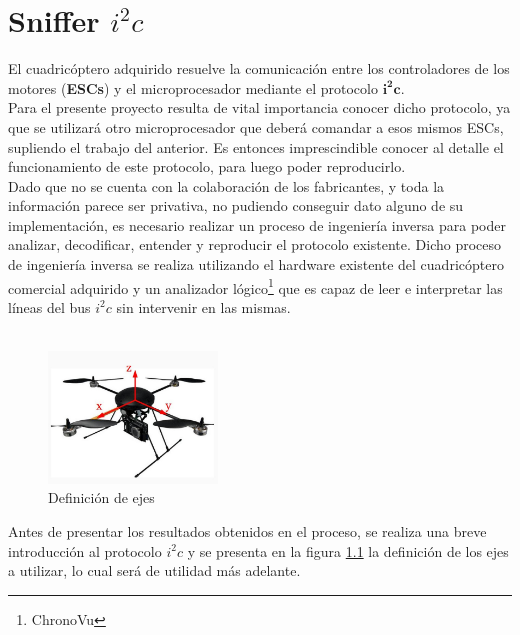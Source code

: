 \documentclass[spanish,12pt,a4paper,titlepage]{report}
\begin{document}
\chapter{Sniffer $i^2c$}

El cuadricóptero adquirido resuelve la comunicación entre los controladores de los motores (\textbf{ESCs}) y el microprocesador mediante el protocolo $\mathbf{i^2c}$.\\

Para el presente proyecto resulta de vital importancia conocer dicho protocolo, ya que se utilizará otro microprocesador que deberá comandar a esos mismos ESCs, supliendo el trabajo del anterior. Es entonces imprescindible conocer al detalle el funcionamiento de este protocolo, para luego poder reproducirlo.\\

Dado que no se cuenta con la colaboración de los fabricantes, y toda la información parece ser privativa, no pudiendo conseguir dato alguno de su implementación, es necesario realizar un proceso de ingeniería inversa para poder analizar, decodificar, entender y reproducir el protocolo existente. Dicho proceso de ingeniería inversa se realiza utilizando el hardware existente del cuadricóptero comercial adquirido y un analizador lógico\footnote{ChronoVu} que es capaz de leer e interpretar las líneas del bus $i^2c$ sin intervenir en las mismas.\\ \\

\begin{figure}
	\vspace{-40pt}
	\begin{center}
	\includegraphics[width=0.4\textwidth]{./pics/ejes_quad.jpg}
	\end{center}
	\vspace{-20pt}
	\caption{Definición de ejes}
	\label{fig:ejes_quad}
	\vspace{-70pt}
\end{figure}

Antes de presentar los resultados obtenidos en el proceso, se realiza una breve introducción al protocolo $i^2c$ y se presenta en la figura \ref{fig:ejes_quad} la definición de los ejes a utilizar, lo cual será de utilidad más adelante.
\end{document}
